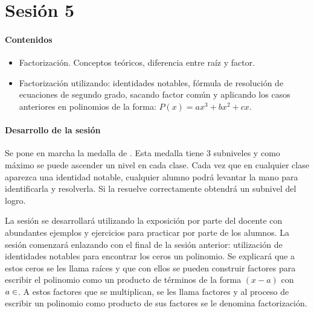 



\section{Sesión 5}


\paragraph{Contenidos}
\begin{itemize}
	\item Factorización. Conceptos teóricos, diferencia entre raíz y factor.
	\item Factorización utilizando: identidades notables, fórmula de resolución de ecuaciones de segundo grado, sacando factor común y aplicando los casos anteriores en polinomios de la forma: $P(x) = ax^3+bx^2+cx$.
\end{itemize}

\paragraph{Desarrollo de la sesión}

Se pone en marcha la medalla de .
%
Esta medalla tiene 3 subniveles y como máximo se puede ascender un nivel en cada clase.
%
Cada vez que en cualquier clase aparezca una identidad notable, cualquier alumno podrá levantar la mano para identificarla y resolverla. 
%
Si la resuelve correctamente obtendrá un subnivel del logro.

La sesión se desarrollará utilizando la exposición por parte del docente con abundantes ejemplos y ejercicios para practicar por parte de los alumnos.
%
La sesión comenzará enlazando con el final de la sesión anterior: utilización de identidades notables para encontrar los ceros un polinomio.
%
Se explicará que a estos ceros se les llama raíces y que con ellos se pueden construir factores para escribir el polinomio como un producto de términos de la forma $(x-a)$ con $a\in\real$.
%
A estos factores que se multiplican, se les llama factores y al proceso de escribir un polinomio como producto de sus factores se le denomina factorización.

